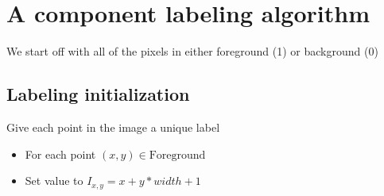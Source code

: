 \documentclass[letterpaper,10pt,english]{sphinxmanual}
\begin{document}
\begin{sphinxVerbatim}[commandchars=\\\{\}]
     
\end{sphinxVerbatim}

\noindent{}


\chapter{A component labeling algorithm}
\label{\detokenize{06-ShapeAnalysis:a-component-labeling-algorithm}}
\sphinxAtStartPar
We start off with all of the pixels in either foreground (1) or background (0)

\begin{sphinxVerbatim}[commandchars=\\\{\}]
   
\PYG{p}{[} \PYG{p}{]}  
  \PYG{p}{[}\PYG{p}{]} 
  
\end{sphinxVerbatim}

\noindent{}


\section{Labeling initialization}
\label{\detokenize{06-ShapeAnalysis:labeling-initialization}}
\sphinxAtStartPar
Give each point in the image a unique label
\begin{itemize}
\item {} 
\sphinxAtStartPar
For each point \((x,y)\in\text{Foreground}\)

\item {} 
\sphinxAtStartPar
Set value to \(I_{x,y} = x+y*width+1\)

\end{itemize}
\end{document}
